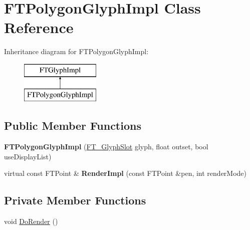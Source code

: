 \hypertarget{class_f_t_polygon_glyph_impl}{}\section{F\+T\+Polygon\+Glyph\+Impl Class Reference}
\label{class_f_t_polygon_glyph_impl}
Inheritance diagram for F\+T\+Polygon\+Glyph\+Impl\+:\begin{figure}[H]
\begin{center}
\leavevmode
\includegraphics[height=2.000000cm]{class_f_t_polygon_glyph_impl}
\end{center}
\end{figure}
\subsection*{Public Member Functions}
\begin{DoxyCompactItemize}
\item 
{\bfseries F\+T\+Polygon\+Glyph\+Impl} (\hyperlink{struct_f_t___glyph_slot_rec__}{F\+T\+\_\+\+Glyph\+Slot} glyph, float outset, bool use\+Display\+List)\hypertarget{class_f_t_polygon_glyph_impl_ab302277a0e76adf9570f1ef9f9ae851f}{}\label{class_f_t_polygon_glyph_impl_ab302277a0e76adf9570f1ef9f9ae851f}

\item 
virtual const F\+T\+Point \& {\bfseries Render\+Impl} (const F\+T\+Point \&pen, int render\+Mode)\hypertarget{class_f_t_polygon_glyph_impl_af689ff9cecc738d292d494bf83adca39}{}\label{class_f_t_polygon_glyph_impl_af689ff9cecc738d292d494bf83adca39}

\end{DoxyCompactItemize}
\subsection*{Private Member Functions}
\begin{DoxyCompactItemize}
\item 
void \hyperlink{class_f_t_polygon_glyph_impl_ad3199eba35d1759d2850a1c6bfb15d76}{Do\+Render} ()
\end{DoxyCompactItemize}
